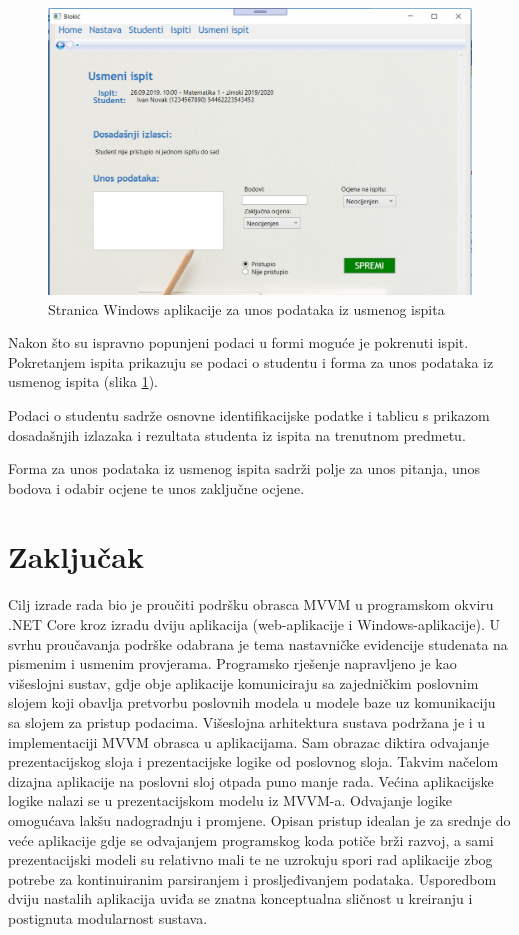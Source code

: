 \documentclass[times, utf8, diplomski]{fer}
\begin{document}
\begin{figure}[htb]
\centering
\includegraphics[width=12cm]{oral2.PNG}
\caption{Stranica Windows aplikacije za unos podataka iz usmenog ispita}
\label{fig:oral2}
\end{figure}

Nakon što su ispravno popunjeni podaci u formi moguće je pokrenuti ispit. Pokretanjem ispita prikazuju se podaci o studentu i forma za unos podataka iz usmenog ispita (slika \ref{fig:oral2}).


Podaci o studentu sadrže osnovne identifikacijske podatke i tablicu s prikazom dosadašnjih izlazaka i rezultata studenta iz ispita na trenutnom predmetu.


Forma za unos podataka iz usmenog ispita sadrži polje za unos pitanja, unos bodova i odabir ocjene te unos zaključne ocjene.


\chapter{Zaključak}
Cilj izrade rada bio je proučiti podršku obrasca MVVM u programskom okviru .NET Core kroz izradu dviju aplikacija (web-aplikacije i Windows-aplikacije). U svrhu  proučavanja podrške odabrana je tema nastavničke evidencije studenata na pismenim i usmenim provjerama. Programsko rješenje napravljeno je kao višeslojni sustav, gdje obje aplikacije komuniciraju sa zajedničkim poslovnim slojem koji obavlja pretvorbu poslovnih modela u modele baze uz komunikaciju sa slojem za pristup podacima. Višeslojna arhitektura sustava podržana je i u implementaciji MVVM obrasca u aplikacijama. Sam obrazac diktira odvajanje prezentacijskog sloja i prezentacijske logike od poslovnog sloja. Takvim načelom dizajna aplikacije na poslovni sloj otpada puno manje rada. Većina aplikacijske logike nalazi se u prezentacijskom modelu iz MVVM-a. Odvajanje logike omogućava lakšu nadogradnju i promjene. Opisan pristup idealan je za srednje do veće aplikacije gdje se odvajanjem programskog koda potiče brži razvoj, a sami prezentacijski modeli su relativno mali te ne uzrokuju spori rad aplikacije zbog potrebe za kontinuiranim parsiranjem i prosljeđivanjem podataka. Usporedbom dviju nastalih aplikacija uviđa se znatna konceptualna sličnost u kreiranju i postignuta modularnost sustava.
\end{document}
